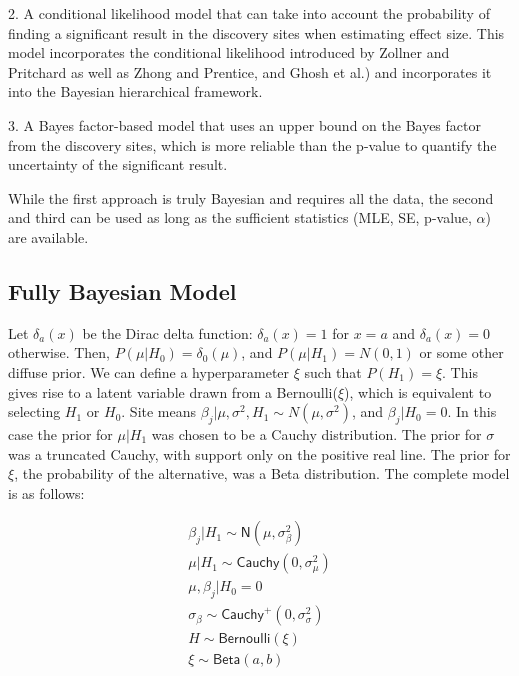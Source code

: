 \documentclass[AMA,STIX1COL]{WileyNJD-v2}\usepackage[]{graphicx}\usepackage[]{color}
\begin{document}
2. A conditional likelihood model that can take into account the probability of finding a significant result in the discovery sites when estimating effect size. This model incorporates the conditional likelihood introduced by Zollner and Pritchard as well as Zhong and Prentice, and Ghosh et al.)\cite{zollner2007overcoming, zhong2008bias, ghosh2008estimating} and incorporates it into the Bayesian hierarchical framework.

3. A Bayes factor-based model that uses an upper bound on the Bayes factor from the discovery sites, which is more reliable than the p-value \cite{benjamin2017redefine} to quantify the uncertainty of the significant result.

While the first approach is truly Bayesian and requires all the data, the second and third can be used as long as the sufficient statistics (MLE, SE, p-value, $\alpha$) are available. 


\subsection{Fully Bayesian Model}

Let $\delta_a(x)$ be the Dirac delta function: $\delta_a(x) = 1$ for $x = a$ and $\delta_a(x)=0$ otherwise. Then, $P( \mu|H_0) = \delta_0 ( \mu )$,  and $P( \mu|H_1) = N(0,1)$ or some other diffuse prior. We can define a hyperparameter $\xi$ such that $P(H_1) = \xi$. This gives rise to a latent variable drawn from a Bernoulli($\xi$), which is equivalent to selecting $H_1$ or $H_0$. Site means $\beta_{j}|\mu, \sigma^2,H_1 \sim N(\mu, \sigma^2)$, and $\beta_{j}|H_0 = 0$. In this case the prior for  $\mu| H_1$ was chosen to be a Cauchy distribution. The prior for $\sigma$ was a truncated Cauchy, with support only on the positive real line. The prior for $\xi$, the probability of the alternative, was a Beta distribution.  The complete model is as follows:

\begin{gather}\label{eq3}
\beta_{j}|H_ 1 \sim \textsf{N}(\mu, \sigma_{\beta}^{2}) \\
\mu|H_1\sim \textsf{Cauchy}(0,\sigma_{\mu}^{2})\\
\mu, \beta_{j}|H_0  =0\\
\sigma_{\beta}\sim \textsf{Cauchy}^+(0,\sigma_{\sigma}^{2})\\
H\sim \textsf{Bernoulli}(\xi)\\
\xi \sim \textsf{Beta}(a, b)
\end{gather}
\end{document}

